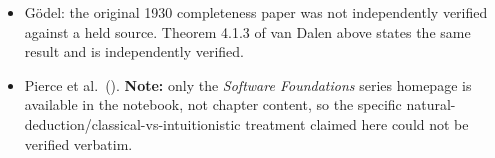 \begin{itemize}
\item
  Gödel: the original 1930 completeness paper was not independently verified against a held source. Theorem 4.1.3 of van Dalen above states the same result and is independently verified.
\item
  Pierce et al.~(\cite{PierceSF}). \textbf{Note:} only the \emph{Software Foundations} series homepage is available in the notebook, not chapter content, so the specific natural-deduction/classical-vs-intuitionistic treatment claimed here could not be verified verbatim.
\end{itemize}
